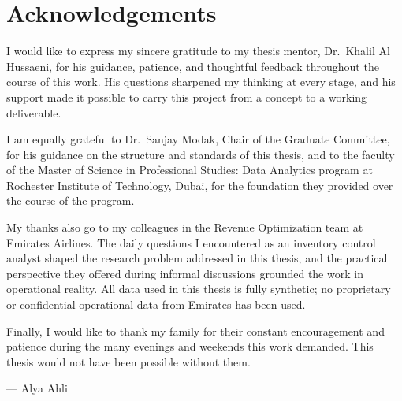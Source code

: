 \chapter*{Acknowledgements}

I would like to express my sincere gratitude to my thesis mentor, Dr.\ Khalil Al Hussaeni, for his guidance, patience, and thoughtful feedback throughout the course of this work. His questions sharpened my thinking at every stage, and his support made it possible to carry this project from a concept to a working deliverable.

I am equally grateful to Dr.\ Sanjay Modak, Chair of the Graduate Committee, for his guidance on the structure and standards of this thesis, and to the faculty of the Master of Science in Professional Studies: Data Analytics program at Rochester Institute of Technology, Dubai, for the foundation they provided over the course of the program.

My thanks also go to my colleagues in the Revenue Optimization team at Emirates Airlines. The daily questions I encountered as an inventory control analyst shaped the research problem addressed in this thesis, and the practical perspective they offered during informal discussions grounded the work in operational reality. All data used in this thesis is fully synthetic; no proprietary or confidential operational data from Emirates has been used.

Finally, I would like to thank my family for their constant encouragement and patience during the many evenings and weekends this work demanded. This thesis would not have been possible without them.

\vspace{1em}
\noindent --- Alya Ahli
